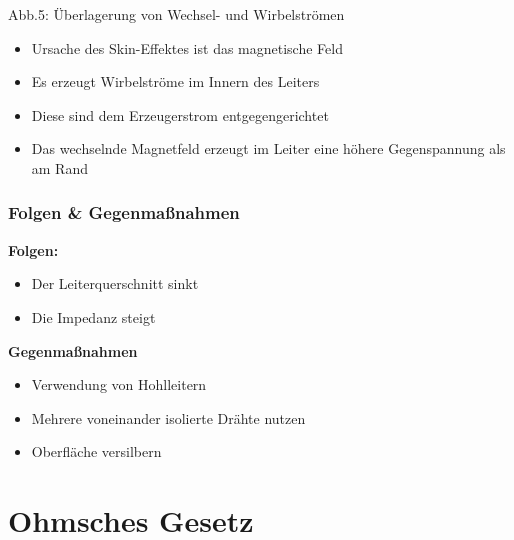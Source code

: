 \begin{frame}
\begin{center}
            \small{Abb.5: Überlagerung von Wechsel- und Wirbelströmen \cite{wp}}
        \begin{itemize}
            \item Ursache des Skin-Effektes ist das magnetische Feld
            \item Es erzeugt Wirbelströme im Innern des Leiters
            \item Diese sind dem Erzeugerstrom entgegengerichtet
            \item Das wechselnde Magnetfeld erzeugt im Leiter eine höhere Gegenspannung als am Rand
        \end{itemize}
  \end{center}
\end{frame}

\begin{frame}
    \frametitle{Folgen \& Gegenmaßnahmen}
    \textbf{Folgen:}
    \begin{itemize}
        \item Der Leiterquerschnitt sinkt
        \item Die Impedanz steigt
    \end{itemize}
    \textbf{Gegenmaßnahmen}
    \begin{itemize}
        \item Verwendung von Hohlleitern
        \item Mehrere voneinander isolierte Drähte nutzen
        \item Oberfläche versilbern
    \end{itemize}
\end{frame}

\section{Ohmsches Gesetz}

